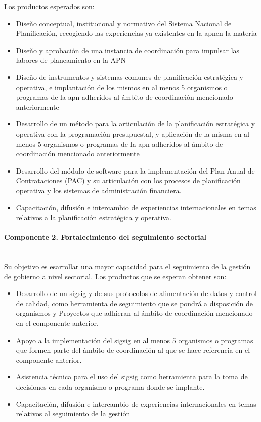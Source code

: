 Los productos esperados son: 
    \begin{itemize}
        \item Diseño conceptual, institucional y normativo del Sistema Nacional de Planificación, recogiendo las experiencias ya existentes en la \ac{apn}en la materia
        \item Diseño y aprobación de una instancia de coordinación para impulsar las labores de planeamiento en la APN
        \item Diseño de instrumentos y sistemas comunes de planificación estratégica y operativa, e implantación de los mismos en al menos 5 organismos o programas de la \ac{apn} adheridos al ámbito de coordinación mencionado anteriormente
        \item Desarrollo de un método para la articulación de la planificación estratégica y operativa con la programación presupuestal, y aplicación de la misma en al menos 5 organismos o programas de la \ac{apn} adheridos al ámbito de coordinación mencionado anteriormente
        \item Desarrollo del módulo de software para la implementación del Plan Anual de Contrataciones (PAC) y su articulación con los procesos de planificación operativa y los sistemas de administración financiera.
        \item Capacitación, difusión e intercambio de experiencias internacionales en temas relativos a la planificación estratégica y operativa. 
    \end{itemize}

  
\paragraph{Componente 2. Fortalecimiento del seguimiento sectorial} \mbox{}\\


Su objetivo es esarrollar una mayor capacidad para el seguimiento de la gestión de gobierno a nivel sectorial. Los productos que se esperan obtener son:

    \begin{itemize}
        \item Desarrollo de un \ac{sigsig} y de sus protocolos de alimentación de datos y control de calidad, como herramienta de seguimiento que se pondrá a disposición de organismos y Proyectos que adhieran al ámbito de coordinación mencionado en el componente anterior.
        \item Apoyo a la implementación del \ac{sigsig} en al menos 5 organismos o programas que formen parte del ámbito de coordinación al que se hace referencia en el componente anterior.
        \item Asistencia técnica para el uso del \ac{sigsig} como herramienta para la toma de decisiones en cada organismo o programa donde se implante.
        \item Capacitación, difusión e intercambio de experiencias internacionales en temas relativos al seguimiento de la gestión 
    \end{itemize}


